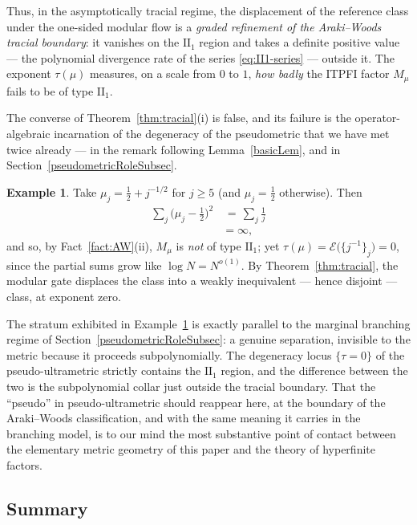 \documentclass[twoside,11pt,letter]{article}
\newcommand{\cexp}{\mathcal{E}}  %
\theoremstyle{definition}
\theoremstyle{definition}
\newtheorem{example}[theorem]{Example}
\theoremstyle{plain}
\begin{document}
Thus, in the asymptotically tracial regime, the displacement of the reference class under the one-sided modular flow is a \emph{graded refinement of the Araki--Woods tracial boundary}: it vanishes on the $\mathrm{II}_1$ region and takes a definite positive value --- the polynomial divergence rate of the series \eqref{eq:II1-series} --- outside it. The exponent $\tau(\mu)$ measures, on a scale from $0$ to $1$, \emph{how badly} the ITPFI factor $M_\mu$ fails to be of type $\mathrm{II}_1$.

The converse of Theorem~\ref{thm:tracial}(i) is false, and its failure is the operator-algebraic incarnation of the degeneracy of the pseudometric that we have met twice already --- in the remark following Lemma~\ref{basicLem}, and in Section~\ref{pseudometricRoleSubsec}.

\begin{example}
\label{ex:marginal-factor}
Take $\mu_j = \tfrac12 + j^{-1/2}$ for $j \ge 5$ (and $\mu_j = \tfrac12$ otherwise). Then 
\begin{equation*}
\begin{split}
\sum_j \big(\mu_j - \frac12\big)^2 &\,= \,\sum_j \frac{1}{j}\\
&= \infty,
\end{split}
\end{equation*}
and so, by Fact~\ref{fact:AW}(ii), $M_\mu$ is \emph{not} of type $\mathrm{II}_1$; yet $\tau(\mu) = \cexp\bigl( \{ j^{-1} \}_j \bigr) = 0$, since the partial sums grow like $\log N = N^{o(1)}$. By Theorem~\ref{thm:tracial}, the modular gate displaces the class into a weakly inequivalent --- hence disjoint --- class, at exponent zero.
\end{example}

The stratum exhibited in Example~\ref{ex:marginal-factor} is exactly parallel to the marginal branching regime of Section~\ref{pseudometricRoleSubsec}: a genuine
separation, invisible to the metric because it proceeds subpolynomially. The degeneracy locus $\{ \tau = 0 \}$ of the pseudo-ultrametric strictly contains the $\mathrm{II}_1$ region, and the difference between the two is the subpolynomial collar just outside the tracial boundary. That the ``pseudo'' in pseudo-ultrametric should reappear here, at the boundary of the Araki--Woods classification, and with the same meaning it carries in the branching model, is to our mind the most substantive point of contact between the elementary metric geometry of this paper and the theory of hyperfinite factors.

\subsection{Summary}
\label{sec:AW-summary}
\end{document}
